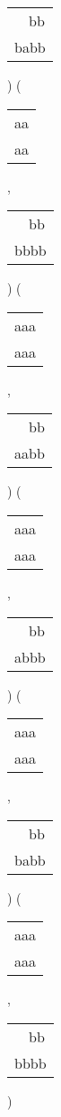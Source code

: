 \begin{description}
\begin{tabular}{|l|}
\ \ bb \\
babb \\
\hline
\end{tabular} 
) 
 ( 
\begin{tabular}{|l|} \hline
aa \\
aa \\
\hline
\end{tabular} 
 , 
\begin{tabular}{|l|} \hline
\ \ bb \\
bbbb \\
\hline
\end{tabular} 
) 
 ( 
\begin{tabular}{|l|} \hline
aaa \\
aaa \\
\hline
\end{tabular} 
 , 
\begin{tabular}{|l|} \hline
\ \ bb \\
aabb \\
\hline
\end{tabular} 
) 
 ( 
\begin{tabular}{|l|} \hline
aaa \\
aaa \\
\hline
\end{tabular} 
 , 
\begin{tabular}{|l|} \hline
\ \ bb \\
abbb \\
\hline
\end{tabular} 
) 
 ( 
\begin{tabular}{|l|} \hline
aaa \\
aaa \\
\hline
\end{tabular} 
 , 
\begin{tabular}{|l|} \hline
\ \ bb \\
babb \\
\hline
\end{tabular} 
) 
 ( 
\begin{tabular}{|l|} \hline
aaa \\
aaa \\
\hline
\end{tabular} 
 , 
\begin{tabular}{|l|} \hline
\ \ bb \\
bbbb \\
\hline
\end{tabular} 
) 
\end{description}

